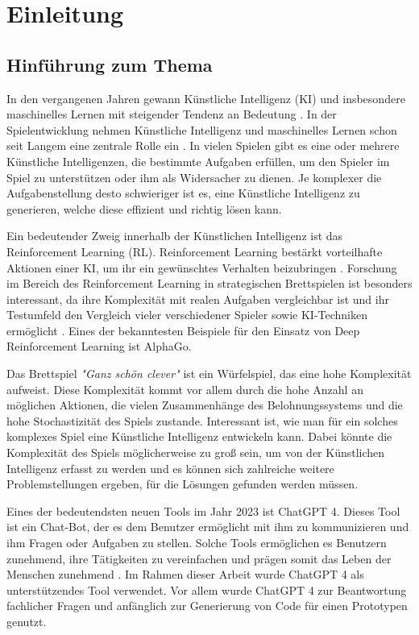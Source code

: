 \section{Einleitung}
\subsection{Hinführung zum Thema}
In den vergangenen Jahren gewann Künstliche Intelligenz (KI) und insbesondere maschinelles Lernen mit steigender Tendenz an Bedeutung \cite{statista_aiworldwide}. In der Spielentwicklung nehmen Künstliche Intelligenz und maschinelles Lernen schon seit Langem eine zentrale Rolle ein \cite{noauthor_kunstliche_2023,millington_ai_2019}. In vielen Spielen gibt es eine oder mehrere Künstliche Intelligenzen, die bestimmte Aufgaben erfüllen, um den Spieler im Spiel zu unterstützen oder ihm als Widersacher zu dienen. Je komplexer die Aufgabenstellung desto schwieriger ist es, eine Künstliche Intelligenz zu generieren, welche diese effizient und richtig lösen kann. 

Ein bedeutender Zweig innerhalb der Künstlichen Intelligenz ist das Reinforcement Learning (RL). Reinforcement Learning bestärkt vorteilhafte Aktionen einer KI, um ihr ein gewünschtes Verhalten beizubringen \cite[S. 11]{ris-ala_fundamentals_2023}. Forschung im Bereich des Reinforcement Learning in strategischen Brettspielen ist besonders interessant, da ihre Komplexität mit realen Aufgaben vergleichbar ist und ihr Testumfeld den Vergleich vieler verschiedener Spieler sowie KI-Techniken ermöglicht \cite[S. 1]{millington_ai_2019}. Eines der bekanntesten Beispiele für den Einsatz von Deep Reinforcement Learning ist AlphaGo.

Das Brettspiel \textit{"Ganz schön clever"} ist ein Würfelspiel, das eine hohe Komplexität aufweist. Diese Komplexität kommt vor allem durch die hohe Anzahl an möglichen Aktionen, die vielen Zusammenhänge des Belohnungssystems und die hohe Stochastizität des Spiels zustande. Interessant ist, wie man für ein solches komplexes Spiel eine Künstliche Intelligenz entwickeln kann. Dabei könnte die Komplexität des Spiels möglicherweise zu groß sein, um von der Künstlichen Intelligenz erfasst zu werden und es können sich zahlreiche weitere Problemstellungen ergeben, für die Lösungen gefunden werden müssen.

Eines der bedeutendsten neuen Tools im Jahr 2023 ist ChatGPT 4. Dieses Tool ist ein Chat-Bot, der es dem Benutzer ermöglicht mit ihm zu kommunizieren und ihm Fragen oder Aufgaben zu stellen. Solche Tools ermöglichen es Benutzern zunehmend, ihre Tätigkeiten zu vereinfachen und prägen somit das Leben der Menschen zunehmend \cite{tagesschaude_chatgpt_nodate}. Im Rahmen dieser Arbeit wurde ChatGPT 4 als unterstützendes Tool verwendet. Vor allem wurde ChatGPT 4 zur Beantwortung fachlicher Fragen und anfänglich zur Generierung von Code für einen Prototypen genutzt.

